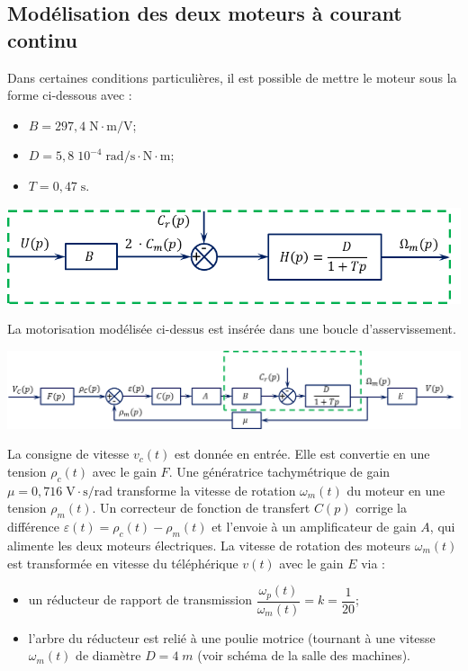 \documentclass[10pt]{article}
\newif\ifprof
\begin{document}
\subsection*{Modélisation des deux moteurs à courant continu}
\ifprof
\else
\vspace{.25cm}

\begin{minipage}[c]{.4\linewidth}
Dans certaines conditions particulières, il est possible de mettre le moteur sous la forme ci-dessous avec :
\begin{itemize}
\item $B=297,4\; \text{N}\cdot \text{m⁄V}$;
\item $D=5,8\;10^{-4} \;  \text{rad⁄s}\cdot \text{N}\cdot\text{m}$;
\item $T=0,47\;\text{s}$.
\end{itemize}
\end{minipage}\hfill
\begin{minipage}[c]{.59\linewidth}
\begin{center}
\includegraphics[width=.9\textwidth]{images/SchemaBloc_02}
\end{center}
\end{minipage}

\vspace{.25cm}

La motorisation modélisée ci-dessus est insérée dans une boucle d’asservissement.

\begin{center}
\includegraphics[width=\textwidth]{images/SchemaBloc_03}
\end{center}


La consigne de vitesse $v_c(t)$ est donnée en entrée. Elle est convertie en une tension $\rho_c(t)$ avec le gain $F$. Une génératrice tachymétrique de gain $\mu =0,716 \; \text{V}\cdot \text{s/rad}$ transforme la vitesse de rotation $\omega_m(t)$ du moteur en une tension $\rho_m(t)$. Un correcteur de fonction de transfert $C(p)$ corrige la différence $\varepsilon (t)= \rho_c(t) -  \rho_m(t)$ et l’envoie à un amplificateur de gain $A$, qui alimente les deux moteurs électriques. La vitesse de rotation des moteurs $\omega_m(t)$ est transformée en vitesse du téléphérique $v(t)$ avec le gain $E$ via :
\begin{itemize}
\item un réducteur de rapport de transmission $\dfrac{\omega_p(t)}{\omega_m(t)} = k =\dfrac{1}{20}$;
\item l'arbre du réducteur
est relié à une poulie motrice (tournant à une vitesse $\omega_m(t)$ de diamètre $D=4\;m$ (voir schéma de la salle des machines).
\end{itemize}
\end{document}

